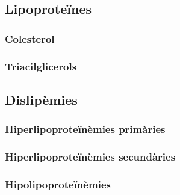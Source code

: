 \subsection{Lipoproteïnes}
\label{sec:lipoproteines}


\subsubsection{Colesterol}
\label{sec:colesterol}


\subsubsection{Triacilglicerols}
\label{sec:triacilglicerols}



\subsection{Dislipèmies}
\label{sec:dislipemies}

\subsubsection{Hiperlipoproteïnèmies primàries}
\label{sec:hiperl-prim}


\subsubsection{Hiperlipoproteïnèmies secundàries}
\label{sec:hiperl-secund}


\subsubsection{Hipolipoproteïnèmies}
\label{sec:hipolipoproteinemies}

